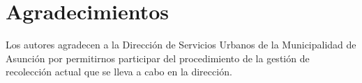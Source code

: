 \documentclass[spanish, conference]{IEEEtran}
\begin{document}
\section*{Agradecimientos}

Los autores agradecen a la Dirección de Servicios Urbanos de la Municipalidad de Asunción por permitirnos participar del procedimiento de la gestión de recolección actual que se lleva a cabo en la dirección.




\vspace{12pt}
\end{document}
